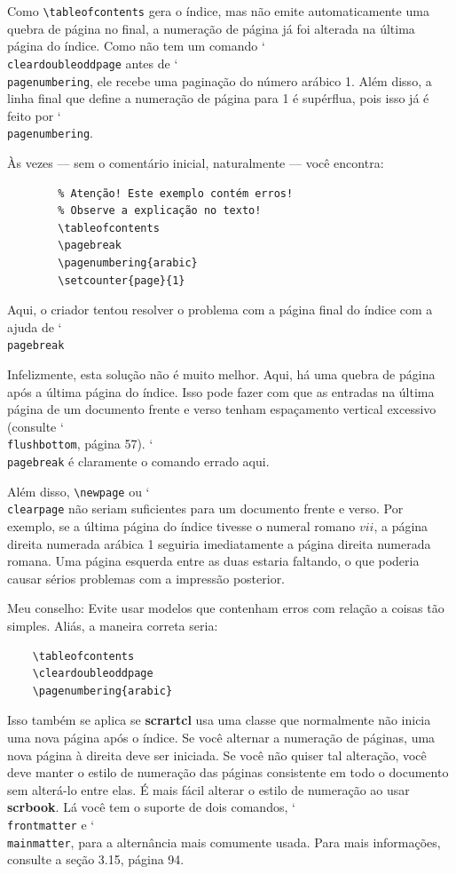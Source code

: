 Como \verb|\tableofcontents| gera o índice, mas não emite automaticamente uma quebra de página no final, a numeração de página já foi alterada na última página do índice. Como não tem um comando \char`\\\texttt{clear\-dou\-ble\-odd\-pa\-ge} antes de \char`\\\texttt{pa\-ge\-num\-be\-ring}, ele recebe uma paginação do número arábico 1. Além disso, a linha final que define a numeração de página para 1 é supérflua, pois isso já é feito por \char`\\\texttt{pa\-ge\-num\-be\-ring}.

Às vezes --- sem o comentário inicial, naturalmente --- você encontra:
\begin{verbatim}
        % Atenção! Este exemplo contém erros!
        % Observe a explicação no texto!
        \tableofcontents
        \pagebreak
        \pagenumbering{arabic}
        \setcounter{page}{1}
\end{verbatim}

Aqui, o criador tentou resolver o problema com a página final do índice com a ajuda de \char`\\\texttt{pa\-ge\-break}

Infelizmente, esta solução não é muito melhor. Aqui, há uma quebra de página após a última página do índice. Isso pode fazer com que as entradas na última página de um documento frente e verso tenham espaçamento vertical excessivo (consulte \char`\\\texttt{flush\-bot\-tom}, página 57). \char`\\\texttt{pa\-ge\-break} é claramente o comando errado aqui.

Além disso, \verb|\newpage| ou \char`\\\texttt{clear\-pa\-ge} não seriam suficientes para um documento frente e verso. Por exemplo, se a última página do índice tivesse o numeral romano $vii$, a página direita numerada arábica 1 seguiria imediatamente a página direita numerada romana. Uma página esquerda entre as duas estaria faltando, o que poderia causar sérios problemas com a impressão posterior.

Meu conselho: Evite usar modelos que contenham erros com relação a coisas tão simples. Aliás, a maneira correta seria:
\begin{verbatim}
    \tableofcontents
    \cleardoubleoddpage
    \pagenumbering{arabic}
\end{verbatim}

Isso também se aplica se \textbf{scrartcl} usa uma classe que normalmente não inicia uma nova página após o índice. Se você alternar a numeração de páginas, uma nova página à direita deve ser iniciada. Se você não quiser tal alteração, você deve manter o estilo de numeração das páginas consistente em todo o documento sem alterá-lo entre elas. É mais fácil alterar o estilo de numeração ao usar \textbf{scrbook}. Lá você tem o suporte de dois comandos, \char`\\\texttt{front\-matter} e \char`\\\texttt{main\-matter}, para a alternância mais comumente usada. Para mais informações, consulte a seção 3.15, página 94.
